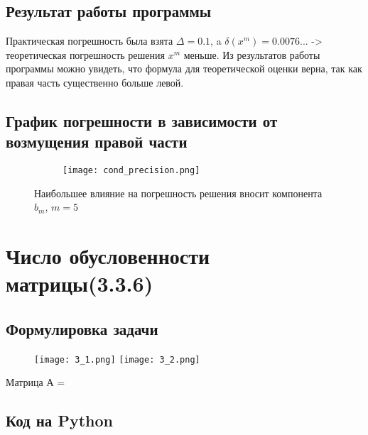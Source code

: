 \documentclass[a4paper,12pt]{article}
\newenvironment{longlisting}{\captionsetup{type=listing}}{}
\begin{document}
\subsection{Результат работы программы}
\begin{longlisting}

\end{longlisting}
Практическая погрешность была взята $\Delta = 0.1$, a $\delta{(x^m)} = 0.0076...$ -> теоретическая погрешность решения $x^m$ меньше.
Из результатов работы программы можно увидеть, что формула для теоретической оценки верна, так как правая часть существенно больше левой. 


\subsection{График погрешности в зависимости от возмущения правой части}
\begin{figure}[H]
\centering
\begin{subfigure}{.5\textwidth}
  \centering
  \texttt{[image: cond\_precision.png]}
  \label{fig:sub1}
\end{subfigure}%
\caption{Наибольшее влияние на погрешность решения вносит компонента $b_m$, $m=5$}
\label{fig:test}
\end{figure}

\section{Число обусловенности матрицы(3.3.6)}
\subsection{Формулировка задачи}
\begin{figure}[H]
\centering
  \texttt{[image: 3\_1.png]}
  \texttt{[image: 3\_2.png]}
\end{figure}
Матрица А = 
\subsection{Код на Python}
\begin{longlisting}
\inputminted{python}{cond_2.0.py}
\end{longlisting}
\end{document}
